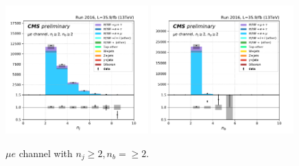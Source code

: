 \begin{figure}[ht]
    \includegraphics[width=0.49\textwidth]{chapters/Analysis/sectionPlots/figures/kinematics_pickles/emu/2b/emu_2b_nJets.pdf}
    \includegraphics[width=0.49\textwidth]{chapters/Analysis/sectionPlots/figures/kinematics_pickles/emu/2b/emu_2b_nBJets.pdf}
    
    \caption{$\mu e$ channel with $n_j\geq2, n_b=\geq2$.}
\end{figure}

